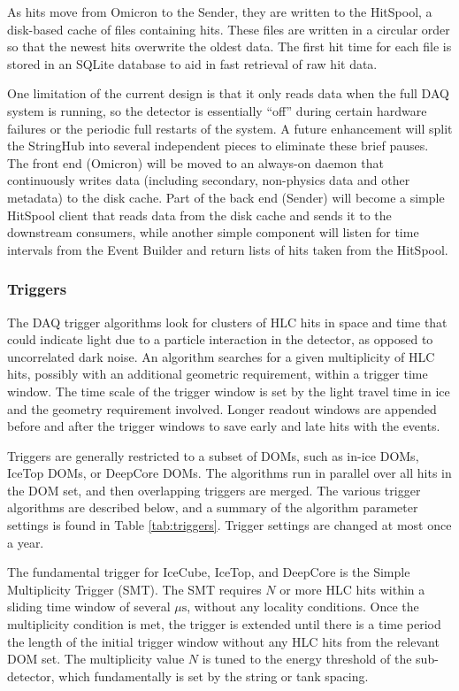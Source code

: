 As hits move from Omicron to the Sender, they are written to the
HitSpool, a disk-based cache of files containing hits.  These files are
written in a circular order so that the newest hits overwrite the oldest
data.  The first hit time for each file is stored in an SQLite database to
aid in fast retrieval of raw hit data.

One limitation of the current design is that it only reads data when
the full DAQ system is running, so the detector is essentially ``off''
during certain hardware failures or the periodic full restarts of the system.
A future enhancement 
will split the StringHub into several independent pieces to eliminate these
brief pauses.  The front end (Omicron) will be moved to an always-on daemon
that continuously writes data (including secondary, non-physics data and
other metadata) to the disk cache.  Part of the back end (Sender) 
will become a simple HitSpool client that reads data from the disk cache
and sends it to the downstream consumers, while another simple component
will listen for time intervals from the Event Builder and return lists of
hits taken from the HitSpool.

\subsubsection{\label{sect:online:trigger}Triggers}

The DAQ trigger algorithms look for clusters of HLC hits in space and time
that could indicate light due to a particle interaction in the detector, as
opposed to uncorrelated dark noise.   An algorithm searches for a given
multiplicity of HLC hits, possibly with an additional geometric
requirement, within a trigger time window.  The time scale of the trigger window is
set by the light travel time in ice and the geometry requirement
involved. Longer readout windows are appended before and after the trigger
windows to save early and late hits with the events.

Triggers are generally restricted to a subset of DOMs, such as in-ice DOMs,
IceTop DOMs, or DeepCore DOMs.  The algorithms run in parallel over all
hits in the DOM set, and then overlapping triggers are merged.  The various
trigger algorithms are described below, and a summary of the algorithm
parameter settings is found in Table \ref{tab:triggers}.  Trigger settings
are changed at most once a year.

The fundamental trigger for IceCube, IceTop, and DeepCore is the Simple
Multiplicity Trigger (SMT).  The SMT requires $N$ or more HLC hits within a
sliding time window of several $\mu\mathrm{s}$, without any locality
conditions.  Once the multiplicity condition is met, the trigger is 
extended until there is a time period the length of the initial trigger
window without any HLC hits from the relevant DOM set.  The
multiplicity value $N$ is tuned to the energy threshold of the sub-detector,
which fundamentally is set by the string or tank spacing.

